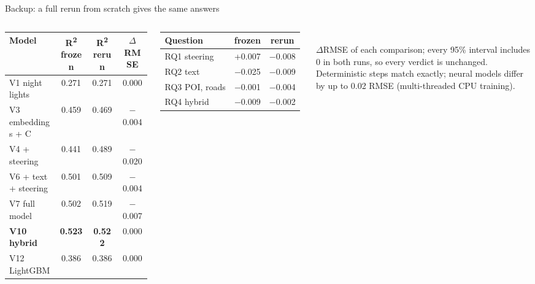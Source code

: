 \documentclass[aspectratio=169,10pt]{beamer}
\newcommand{\fnote}[1]{{\fontsize{7}{8.5}\selectfont\color{muted}#1}}
\begin{document}
\begin{frame}{Backup: a full rerun from scratch gives the same answers}
\begin{columns}[T,onlytextwidth]
{\renewcommand{\arraystretch}{1.2}\footnotesize
\begin{tabular}{@{}lccc@{}}
\toprule
Model & R\textsuperscript{2} frozen & R\textsuperscript{2} rerun & $\Delta$RMSE\\
\midrule
V1 night lights & 0.271 & 0.271 & 0.000\\
V3 embeddings + C & 0.459 & 0.469 & $-$0.004\\
V4 + steering & 0.441 & 0.489 & $-$0.020\\
V6 + text + steering & 0.501 & 0.509 & $-$0.004\\
V7 full model & 0.502 & 0.519 & $-$0.007\\
\textbf{V10 hybrid} & \textbf{0.523} & \textbf{0.522} & 0.000\\
V12 LightGBM & 0.386 & 0.386 & 0.000\\
\bottomrule
\end{tabular}}
{\renewcommand{\arraystretch}{1.3}\footnotesize
\begin{tabular}{@{}lcc@{}}
\toprule
Question & frozen & rerun\\
\midrule
RQ1 steering & +0.007 & $-$0.008\\
RQ2 text & $-$0.025 & $-$0.009\\
RQ3 POI, roads & $-$0.001 & $-$0.004\\
RQ4 hybrid & $-$0.009 & $-$0.002\\
\bottomrule
\end{tabular}}\\[6pt]
\fnote{$\Delta$RMSE of each comparison; every 95\% interval includes 0 in both runs, so every verdict is unchanged.
Deterministic steps match exactly; neural models differ by up to 0.02 RMSE (multi-threaded CPU training).}
\end{columns}
\end{frame}
\end{document}
